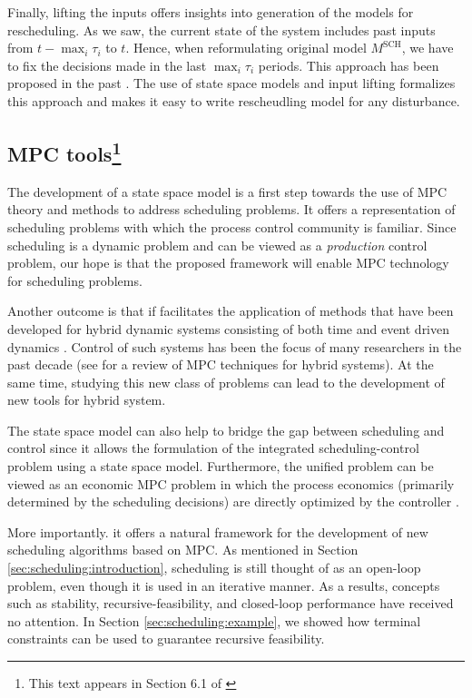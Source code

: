 Finally, lifting the inputs offers
insights into generation of the models for rescheduling. As we saw,
the current state of the system includes past inputs from
$t-\max_i{\tau_i}$ to $t$. Hence, when reformulating original model
$M^{\text{SCH}}$, we have to fix the decisions made in the last
$\max_i{\tau_i}$ periods. This approach has been proposed in the past
\citep{sundaramoorthy:maravelias:2010}. The use of state space models
and input lifting formalizes this approach and makes it easy to write
rescheudling model for any disturbance. 

\subsection{MPC tools\footnote{This text appears in Section 6.1 of \citet{subramanian:maravelias:rawlings:2012}}}

The development of a state space model is a first step towards the use
of MPC theory and methods to address scheduling problems. It offers a
representation of scheduling problems with which the process control
community is familiar. Since scheduling is a dynamic problem and can
be viewed as a {\emph{production}} control problem, our hope is that
the proposed framework will enable MPC technology for scheduling
problems. 

Another outcome is that if facilitates the application of methods that
have been developed for hybrid dynamic systems consisting of both time
and event driven dynamics \citep{bemporad:morari:1999,
  heemels:schutter:bemporad:2001}. Control of such systems has been the
focus of many researchers in the past decade (see \citep{camacho:ramirez:limon:pena:alamo:2010} for a
review of MPC techniques for hybrid systems). At the same time,
studying this new class of problems can lead to the development of new
tools for hybrid system.

The state space model can also help to bridge the gap between
scheduling and control since it allows the formulation of the
integrated scheduling-control problem using a state space
model. Furthermore, the unified problem can be viewed as an economic
MPC problem in which the process economics (primarily determined by
the scheduling decisions) are directly optimized by the controller \citep{diehl:amrit:rawlings:2011}.

More importantly. it offers a natural framework for the development
of new scheduling algorithms based on MPC. As mentioned in Section
\ref{sec:scheduling:introduction}, scheduling is still thought of as
an open-loop problem, even though it is used in an iterative
manner. As a results, concepts such as stability,
recursive-feasibility, and closed-loop performance have received no
attention. In Section \ref{sec:scheduling:example}, we showed how
terminal constraints can be used to guarantee recursive feasibility.





